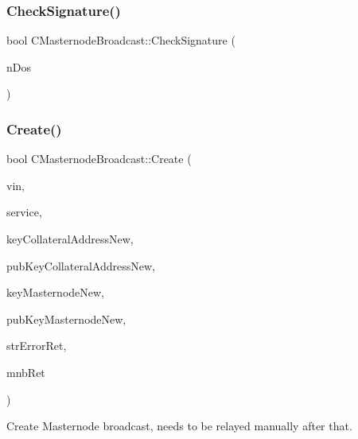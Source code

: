\subsubsection{\texorpdfstring{Check\+Signature()}{CheckSignature()}}
{\footnotesize\ttfamily bool C\+Masternode\+Broadcast\+::\+Check\+Signature (\begin{DoxyParamCaption}\item[{int \&}]{n\+Dos }\end{DoxyParamCaption})}

\mbox{\label{class_c_masternode_broadcast_a3b331bac6aa4ab8ece112b62243f7498}} 
\subsubsection{\texorpdfstring{Create()}{Create()}\hspace{0.1cm}{\footnotesize\ttfamily [1/2]}}
{\footnotesize\ttfamily bool C\+Masternode\+Broadcast\+::\+Create (\begin{DoxyParamCaption}\item[{C\+Tx\+In}]{vin,  }\item[{\mbox{\hyperlink{class_c_service}{C\+Service}}}]{service,  }\item[{\mbox{\hyperlink{class_c_key}{C\+Key}}}]{key\+Collateral\+Address\+New,  }\item[{\mbox{\hyperlink{class_c_pub_key}{C\+Pub\+Key}}}]{pub\+Key\+Collateral\+Address\+New,  }\item[{\mbox{\hyperlink{class_c_key}{C\+Key}}}]{key\+Masternode\+New,  }\item[{\mbox{\hyperlink{class_c_pub_key}{C\+Pub\+Key}}}]{pub\+Key\+Masternode\+New,  }\item[{std\+::string \&}]{str\+Error\+Ret,  }\item[{\mbox{\hyperlink{class_c_masternode_broadcast}{C\+Masternode\+Broadcast}} \&}]{mnb\+Ret }\end{DoxyParamCaption})\hspace{0.3cm}{\ttfamily [static]}}



Create Masternode broadcast, needs to be relayed manually after that. 

\mbox{\label{class_c_masternode_broadcast_a5b999adcbdb1de059cb226f3367771b0}} 
